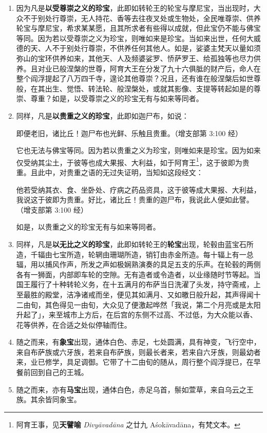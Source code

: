 \begin{enumerate}
\item 因为凡是\textbf{以受尊崇之义的珍宝}，此即如转轮王的轮宝与摩尼宝，当出现时，大众不于别处行尊崇，无人持花、香等去往夜叉处或生物处，全民唯尊崇、供养轮宝与摩尼宝，希求某某愿，且其所求者有些得以成就，但此宝仍不能与佛宝等同。因为若以受尊崇之义为珍宝，则唯如来是珍宝。当如来出世，任何大威德的天、人不于别处行尊崇，不供养任何其他人。如是，娑婆主梵天以量如须弥山的宝环供养如来，其他天、人及频婆娑罗、㤭萨罗王、给孤独等也尽力供养。且对业已般涅槃的世尊，阿育大王在分发了九十六俱胝的财产后，命人在整个阎浮提起了八万四千寺，遑论其他尊崇？况且，还有谁在般涅槃后如世尊般，在其出生、觉悟、转法轮、般涅槃处，或就其影像、支提等转起如是的尊崇、尊重？如是，以受尊崇之义的珍宝无有与如来等同者。
\item 同样，凡是\textbf{以贵重之义的珍宝}，此即如迦尸布，如说：\begin{quoting}即便老旧，诸比丘！迦尸布也光鲜、乐触且贵重。（增支部第 3:100 经）\end{quoting}它也无法与佛宝等同。因为若以贵重之义为珍宝，则唯如来是珍宝。因为如来仅受纳其尘土，于彼等也成大果报、大利益，如于阿育王\footnote{阿育王事，见\textbf{天譬喻} \textit{Divyāvadāna} 之廿九 Aśokāvadāna，有梵文本。}，这于彼即为贵重。且此中，对贵重之语的无过失证明，当知如这段经文：\begin{quoting}他若受纳其衣、食、坐卧处、疗病之药品资具，这于彼等成大果报、大利益，我说这于彼即为贵重。好比，诸比丘！贵重的迦尸布，我说此人便如此譬。（增支部第 3:100 经）\end{quoting}如是，以贵重之义的珍宝无有与如来等同者。
\item 同样，凡是\textbf{以无比之义的珍宝}，此即如转轮王的\textbf{轮宝}出现，轮毂由蓝宝石所造，千辐由七宝所造，轮辋由珊瑚所造，销钉由赤金所造。每十辐上有一总辐，用以捕风作声，所发之声如极娴熟演奏的具足五支的乐声。在轮毂的两侧各有一狮面，内部即车轮的空隙。无有造者或令造者，以业缘随时节等起。当国王履行了十种转轮义务，在十五满月的布萨当日洗濯了头发，持守斋戒，上至最胜的殿堂，洁净诸戒而坐，便见其如满月、又如皦日般升起，其声得闻十二由旬，其色得见一由旬，大众见了便激起哗然「我说，第二个月亮或是太阳升起了」，来至城市上方后，在后宫的东侧不过高、不过低，为大众能以香、花等供养，在合适之处似停轴而住。
\item 随之而来，有\textbf{象宝}出现，通体白色、赤足，七处圆满，具有神变，飞行空中，来自布萨族或六牙族，若来自布萨族，则最长者来，若来自六牙族，则最幼者来，业已修学，具足调御。它带了十二由旬的随从，周行整个阎浮提已，在早餐前回到自己的王城。
\item 随之而来，亦有\textbf{马宝}出现，通体白色，赤足乌首，鬃如萱草，来自乌云之王族。其余皆同象宝。

\end{enumerate}
